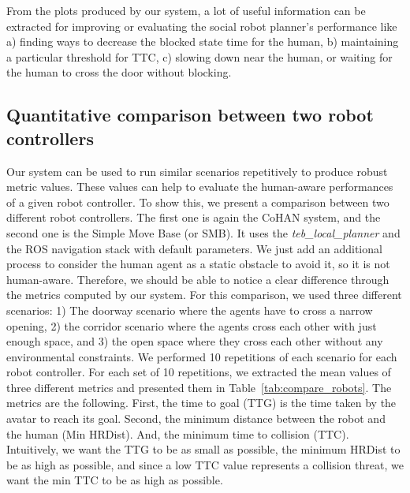 From the plots produced by our system, a lot of useful information can be extracted for improving or evaluating the social robot planner's performance like a) finding ways to decrease the blocked state time for the human, b) maintaining a particular threshold for TTC, c) slowing down near the human, or waiting for the human to cross the door without blocking.


\subsection{Quantitative comparison between two robot controllers}

Our system can be used to run similar scenarios repetitively to produce robust metric values. These values can help to evaluate the human-aware performances of a given robot controller. To show this, we present a comparison between two different robot controllers. The first one is again the CoHAN system, and the second one is the Simple Move Base (or SMB). It uses the \textit{teb\_local\_planner} and the ROS navigation stack with default parameters. We just add an additional process to consider the human agent as a static obstacle to avoid it, so it is not human-aware. Therefore, we should be able to notice a clear difference through the metrics computed by our system. For this comparison, we used three different scenarios: 1) The doorway scenario where the agents have to cross a narrow opening, 2) the corridor scenario where the agents cross each other with just enough space, and 3) the open space where they cross each other without any environmental constraints. We performed 10 repetitions of each scenario for each robot controller. For each set of 10 repetitions, we extracted the mean values of three different metrics and presented them in Table~\ref{tab:compare_robots}. The metrics are the following. First, the time to goal (TTG) is the time taken by the avatar to reach its goal. Second, the minimum distance between the robot and the human (Min HRDist). And, the minimum time to collision (TTC). Intuitively, we want the TTG to be as small as possible, the minimum HRDist to be as high as possible, and since a low TTC value represents a collision threat, we want the min TTC to be as high as possible. 

